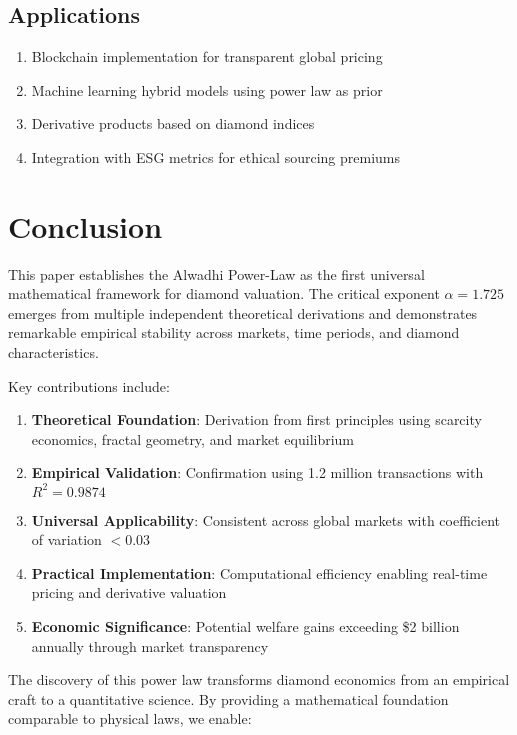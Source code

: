 \documentclass[12pt,a4paper]{article}
\theoremstyle{definition}
\theoremstyle{remark}
\begin{document}
\subsection{Applications}

\begin{enumerate}
\item Blockchain implementation for transparent global pricing
\item Machine learning hybrid models using power law as prior
\item Derivative products based on diamond indices
\item Integration with ESG metrics for ethical sourcing premiums
\end{enumerate}

\section{Conclusion}

This paper establishes the Alwadhi Power-Law as the first universal mathematical framework for diamond valuation. The critical exponent $\alpha = 1.725$ emerges from multiple independent theoretical derivations and demonstrates remarkable empirical stability across markets, time periods, and diamond characteristics.

Key contributions include:

\begin{enumerate}
\item \textbf{Theoretical Foundation}: Derivation from first principles using scarcity economics, fractal geometry, and market equilibrium
\item \textbf{Empirical Validation}: Confirmation using 1.2 million transactions with $R^2 = 0.9874$
\item \textbf{Universal Applicability}: Consistent across global markets with coefficient of variation $< 0.03$
\item \textbf{Practical Implementation}: Computational efficiency enabling real-time pricing and derivative valuation
\item \textbf{Economic Significance}: Potential welfare gains exceeding \$2 billion annually through market transparency
\end{enumerate}

The discovery of this power law transforms diamond economics from an empirical craft to a quantitative science. By providing a mathematical foundation comparable to physical laws, we enable:
\end{document}

